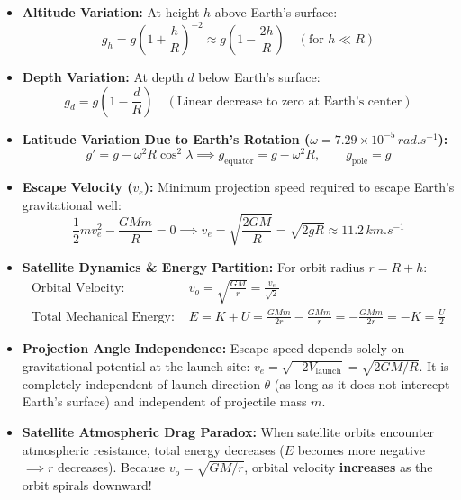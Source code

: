 \documentclass[10pt,a4paper]{article}
\begin{document}
\begin{usecasebox}
\begin{itemize}
  \item \textbf{Altitude Variation:} At height $h$ above Earth's surface:
  \begin{equation}
    g_h = g\left(1 + \frac{h}{R}\right)^{-2} \approx g\left(1 - \frac{2h}{R}\right) \quad (\text{for } h \ll R)
  \end{equation}
  \item \textbf{Depth Variation:} At depth $d$ below Earth's surface:
  \begin{equation}
    g_d = g\left(1 - \frac{d}{R}\right) \quad (\text{Linear decrease to zero at Earth's center})
  \end{equation}
  \item \textbf{Latitude Variation Due to Earth's Rotation ($\omega = 7.29\times 10^{-5}\,\si{rad.s^{-1}}$):}
  \begin{equation}
    g' = g - \omega^2 R\cos^2\lambda \implies g_{\text{equator}} = g - \omega^2 R, \qquad g_{\text{pole}} = g
  \end{equation}
  \item \textbf{Escape Velocity ($v_e$):} Minimum projection speed required to escape Earth's gravitational well:
  \begin{equation}
    \frac{1}{2}m v_e^2 - \frac{GMm}{R} = 0 \implies v_e = \sqrt{\frac{2GM}{R}} = \sqrt{2gR} \approx 11.2\,\si{km.s^{-1}}
  \end{equation}
  \item \textbf{Satellite Dynamics \& Energy Partition:} For orbit radius $r = R + h$:
  \begin{align}
    \text{Orbital Velocity: } &v_o = \sqrt{\frac{GM}{r}} = \frac{v_e}{\sqrt{2}} \\
    \text{Total Mechanical Energy: } &E = K + U = \frac{GMm}{2r} - \frac{GMm}{r} = -\frac{GMm}{2r} = -K = \frac{U}{2}
  \end{align}
\end{itemize}
\end{usecasebox}

\begin{trapbox}
\begin{itemize}
  \item \textbf{Projection Angle Independence:} Escape speed depends solely on gravitational potential at the launch site: $v_e = \sqrt{-2V_{\text{launch}}} = \sqrt{2GM/R}$. It is completely independent of launch direction $\theta$ (as long as it does not intercept Earth's surface) and independent of projectile mass $m$.
  \item \textbf{Satellite Atmospheric Drag Paradox:} When satellite orbits encounter atmospheric resistance, total energy decreases ($E$ becomes more negative $\implies r$ decreases). Because $v_o = \sqrt{GM/r}$, orbital velocity \textbf{increases} as the orbit spirals downward!
\end{itemize}
\end{trapbox}
\end{document}
